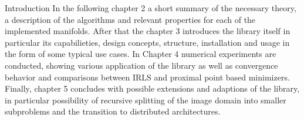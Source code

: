 \begin{chapter}{Introduction}
In the following chapter 2 a short summary of the necessary theory, a description of the algorithms and relevant properties for each of the implemented manifolds.
After that the chapter 3 introduces the library itself in particular its capabilieties, design concepts, structure, installation and usage in the form of some typical
use cases. In Chapter 4 numerical experiments are conducted, showing various application of the library as well as convergence behavior and comparisons between 
IRLS and proximal point based minimizers.\\

Finally, chapter 5 concludes with possible extensions and adaptions of the library, in particular possibility of recursive splitting of the image domain into smaller subproblems and
the transition to distributed architectures.
\end{chapter}
